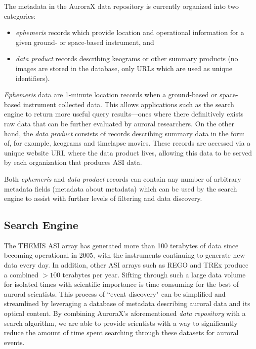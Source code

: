 \documentclass[utf8]{FrontiersinHarvard} %
\begin{document}
The metadata in the AuroraX data repository is currently organized into two categories: 
\begin{itemize}
    \item \textit{ephemeris} records which provide location and operational information for a given ground- or space-based instrument, and
    \item \textit{data product} records describing keograms or other summary products (no images are stored in the database, only URLs which are used as unique identifiers).
\end{itemize} \textit{Ephemeris} data are 1-minute location records when a ground-based or space-based instrument collected data. This allows applications such as the search engine to return more useful query results---ones where there definitively exists raw data that can be further evaluated by auroral researchers. On the other hand, the \textit{data product} consists of records describing summary data in the form of, for example, keograms and timelapse movies. These records are accessed via a unique website URL where the data product lives, allowing this data to be served by each organization that produces ASI data.

Both \textit{ephemeris} and \textit{data product} records can contain any number of arbitrary metadata fields (metadata about metadata) which can be used by the search engine to assist with further levels of filtering and data discovery.

\subsection{Search Engine}
The THEMIS ASI array has generated more than 100 terabytes of data since becoming operational in 2005, with the instruments continuing to generate new data every day. In addition, other ASI arrays such as REGO and TREx produce a combined $>100$ terabytes per year. Sifting through such a large data volume for isolated times with scientific importance is time consuming for the best of auroral scientists. This process of ``event discovery" can be simplified and streamlined by leveraging a database of metadata describing auroral data and its optical content. By combining AuroraX’s aforementioned \textit{data repository} with a search algorithm, we are able to provide scientists with a way to significantly reduce the amount of time spent searching through these datasets for auroral events. 
\end{document}
